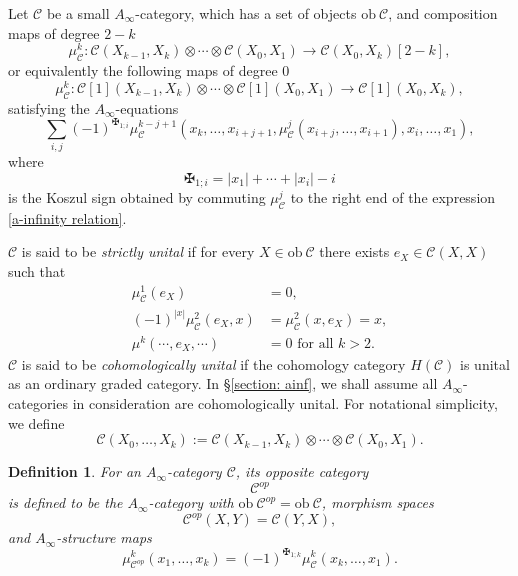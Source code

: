 \documentclass[11pt]{amsproc}
\def\cc{\mathcal{C}}
\def\ainf{A_\infty}
\def\ob{\mathrm{ob\ }}
\newtheorem{defn}[lem]{Definition}
\theoremstyle{remark}
\numberwithin{equation}{section}
\begin{document}
Let $\cc$ be a small $\ainf$-category, 
which has a set of objects $\ob \cc$,
and composition maps of degree $2-k$
\begin{equation}\label{ainf maps}
\mu_{\cc}^{k}: \cc(X_{k-1}, X_{k}) \otimes \cdots \otimes \cc(X_{0}, X_{1}) \to \cc(X_{0}, X_{k})[2-k],
\end{equation}
or equivalently the following maps of degree $0$
\begin{equation}\label{ainf maps shifted}
\mu_{\cc}^{k}: \cc[1](X_{k-1}, X_{k}) \otimes \cdots \otimes \cc[1](X_{0}, X_{1}) \to \cc[1](X_{0}, X_{k}),
\end{equation}
satisfying the $\ainf$-equations 
\begin{equation}\label{a-infinity relation}
\sum_{i, j} (-1)^{\maltese_{1;i}} \mu_{\cc}^{k-j+1}(x_{k}, \ldots, x_{i+j+1}, \mu_{\cc}^{j}(x_{i+j}, \ldots, x_{i+1}), x_{i}, \ldots, x_{1}),
\end{equation}
where 
\begin{equation}\label{koszul sign}
\maltese_{1;i} = |x_{1}| + \cdots + |x_{i}| - i
\end{equation}
is the Koszul sign obtained by commuting $\mu_{\cc}^{j}$ to the right end of the expression \eqref{a-infinity relation}.

$\cc$ is said to be {\it strictly unital} if for every $X \in \ob \cc$ there exists $e_{X} \in \cc(X, X)$ such that 
\begin{equation}
\begin{split}
\mu^{1}_{\cc}(e_{X}) &= 0,\\
(-1)^{|x|} \mu^{2}_{\cc}(e_{X}, x) &= \mu^{2}_{\cc}(x, e_{X}) = x, \\
\mu^{k}(\cdots, e_{X}, \cdots) &= 0 \text{ for all } k >2.
\end{split}
\end{equation}
$\cc$ is said to be {\it cohomologically unital} if the cohomology category $H(\cc)$ is unital as an ordinary graded category.
In \S\ref{section: ainf}, we shall assume all $\ainf$-categories in consideration are cohomologically unital.
For notational simplicity, we define
\begin{equation}
\cc(X_{0}, \ldots, X_{k}) := \cc(X_{k-1}, X_{k}) \otimes \cdots \otimes \cc(X_{0}, X_{1}).
\end{equation}

\begin{defn}\label{def: opposite category}
For an $\ainf$-category $\cc$, its {\it opposite category} 
\begin{equation}
\cc^{op}
\end{equation}
is defined to be the $\ainf$-category with $\ob \cc^{op} = \ob \cc$,
morphism spaces
\begin{equation}
\cc^{op}(X, Y) = \cc(Y, X),
\end{equation}
and $\ainf$-structure maps
\begin{equation}
\mu^{k}_{\cc^{op}}(x_{1}, \ldots, x_{k}) = (-1)^{\maltese_{1;k}} \mu^{k}_{\cc}(x_{k}, \ldots, x_{1}).
\end{equation}
\end{defn}
\end{document}

